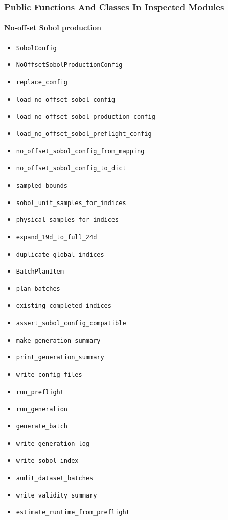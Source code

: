 \documentclass[
]{article}
\providecommand{\tightlist}{%
  \setlength{\itemsep}{0pt}\setlength{\parskip}{0pt}}
\begin{document}
\hypertarget{public-functions-and-classes-in-inspected-modules}{%
\subsubsection{Public Functions And Classes In Inspected
Modules}\label{public-functions-and-classes-in-inspected-modules}}

\hypertarget{no-offset-sobol-production}{%
\paragraph{No-offset Sobol
production}\label{no-offset-sobol-production}}

\begin{itemize}
\tightlist
\item
  \texttt{SobolConfig}
\item
  \texttt{NoOffsetSobolProductionConfig}
\item
  \texttt{replace\_config}
\item
  \texttt{load\_no\_offset\_sobol\_config}
\item
  \texttt{load\_no\_offset\_sobol\_production\_config}
\item
  \texttt{load\_no\_offset\_sobol\_preflight\_config}
\item
  \texttt{no\_offset\_sobol\_config\_from\_mapping}
\item
  \texttt{no\_offset\_sobol\_config\_to\_dict}
\item
  \texttt{sampled\_bounds}
\item
  \texttt{sobol\_unit\_samples\_for\_indices}
\item
  \texttt{physical\_samples\_for\_indices}
\item
  \texttt{expand\_19d\_to\_full\_24d}
\item
  \texttt{duplicate\_global\_indices}
\item
  \texttt{BatchPlanItem}
\item
  \texttt{plan\_batches}
\item
  \texttt{existing\_completed\_indices}
\item
  \texttt{assert\_sobol\_config\_compatible}
\item
  \texttt{make\_generation\_summary}
\item
  \texttt{print\_generation\_summary}
\item
  \texttt{write\_config\_files}
\item
  \texttt{run\_preflight}
\item
  \texttt{run\_generation}
\item
  \texttt{generate\_batch}
\item
  \texttt{write\_generation\_log}
\item
  \texttt{write\_sobol\_index}
\item
  \texttt{audit\_dataset\_batches}
\item
  \texttt{write\_validity\_summary}
\item
  \texttt{estimate\_runtime\_from\_preflight}
\end{itemize}
\end{document}
